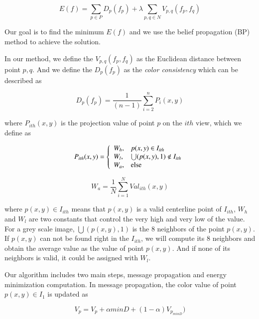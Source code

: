 \begin{equation}
E(f) = \sum_{p\in P} D_{p}(f_{p}) + \lambda \sum_{p,q \in N} V_{p,q}(f_{p}, f_{q})
\end{equation}

Our goal is to find the minimum $E(f)$ and we use the belief propagation (BP)
method to achieve the solution.

In our method, we define the $V_{p,q}(f_{p}, f_{q})$ as the Euclidean
distance between point $p, q$. And we define the $D_{p}(f_{p})$ as the
\emph{color consistency} which can be described as

\begin{equation}
D_{p}(f_{p}) = \frac{1}{(n-1)} \sum_{i=2}^{n} P_{i}(x,y)
\end{equation}

where $P_{ith}(x,y)$ is the projection value of point $p$ on the
$ith$ view, which we define as

\begin{equation}
P_{ith}(x,y) =
\left\{
  \begin{array}{lll}
    W_{h}, & \hbox {$p(x,y) \in I_{ith}$} \\
    W_{l},  & \hbox {$\bigcup(p(x,y), 1) \notin I_{ith}$} \\
    W_{a}, & \hbox {else}
  \end{array}
\right.
\end{equation}

\begin{equation}
W_{a} = \frac{1}{N} \sum_{i=1}^{N} Val_{ith}(x,y)
\end{equation}

where $p(x,y)\in I_{ith}$ means that $p(x,y)$ is a valid centerline
point of $I_{ith}$, $W_{h}$ and $W_{l}$ are two constants that
control the very high and very low of the value. For a grey scale
image, $\bigcup(p(x,y), 1)$ is the 8 neighbors of the point
$p(x,y)$.  If $p(x,y)$ can not be found right in the $I_{ith}$, we
will compute its 8 neighbors and obtain the average value as the
value of point $p(x,y)$. And if none of its neighbors is valid, it
could be assigned with $ W_{l}$.

Our algorithm includes two main steps, message propagation and energy
minimization computation. In message propagation, the color value of
point $p(x,y) \in I_{1}$ is updated as

\begin{equation}
V_{p} = V_{p} + \alpha minD+ (1-\alpha)V_{p_{minD}})
\end{equation}

